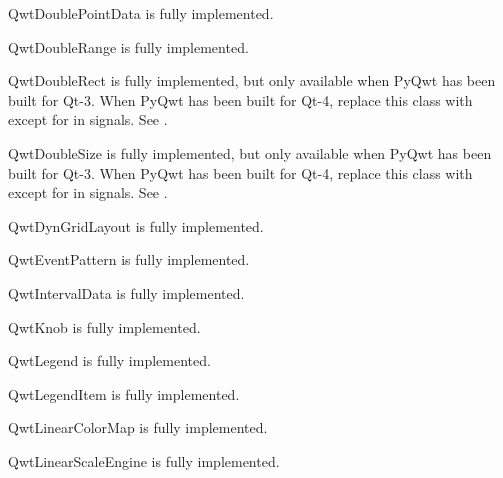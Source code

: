\documentclass{manual}
\begin{document}
\begin{classdesc*}{QwtDoublePointData}
  is fully implemented.
\end{classdesc*}

\begin{classdesc*}{QwtDoubleRange}
  is fully implemented.
\end{classdesc*}

\begin{classdesc*}{QwtDoubleRect}
  is fully implemented, but only available when PyQwt has been built for Qt-3.
  When PyQwt has been built for Qt-4, replace this class with 
  except for in signals. See .
\end{classdesc*}

\begin{classdesc*}{QwtDoubleSize}
  is fully implemented, but only available when PyQwt has been built for Qt-3.
  When PyQwt has been built for Qt-4, replace this class with 
  except for in signals. See .
\end{classdesc*}

\begin{classdesc*}{QwtDynGridLayout}
  is fully implemented.
\end{classdesc*}

\begin{classdesc*}{QwtEventPattern}
  is fully implemented.
\end{classdesc*}

\begin{classdesc*}{QwtIntervalData}
  is fully implemented.
\end{classdesc*}

\begin{classdesc*}{QwtKnob}
  is fully implemented.
\end{classdesc*}

\begin{classdesc*}{QwtLegend}
  is fully implemented.
\end{classdesc*}

\begin{classdesc*}{QwtLegendItem}
  is fully implemented.
\end{classdesc*}

\begin{classdesc*}{QwtLinearColorMap}
  is fully implemented.
\end{classdesc*}

\begin{classdesc*}{QwtLinearScaleEngine}
is fully implemented.
\end{classdesc*}
\end{document}
